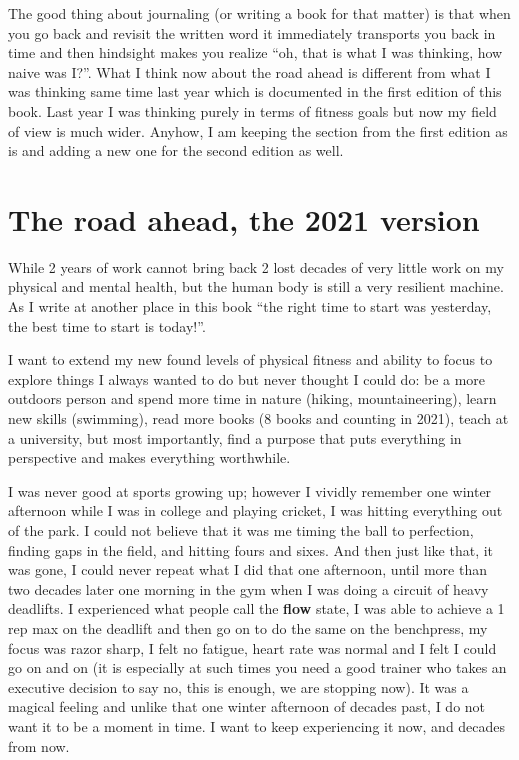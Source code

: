 \documentclass[
  oneside]{book}
\begin{document}
The good thing about journaling (or writing a book for that matter) is that when you go back and revisit the written word it immediately transports you back in time and then hindsight makes you realize ``oh, that is what I was thinking, how naive was I?''. What I think now about the road ahead is different from what I was thinking same time last year which is documented in the first edition of this book. Last year I was thinking purely in terms of fitness goals but now my field of view is much wider. Anyhow, I am keeping the section from the first edition as is and adding a new one for the second edition as well.

\hypertarget{the-road-ahead-the-2021-version}{%
\section{The road ahead, the 2021 version}\label{the-road-ahead-the-2021-version}}

While 2 years of work cannot bring back 2 lost decades of very little work on my physical and mental health, but the human body is still a very resilient machine. As I write at another place in this book ``the right time to start was yesterday, the best time to start is today!''.

I want to extend my new found levels of physical fitness and ability to focus to explore things I always wanted to do but never thought I could do: be a more outdoors person and spend more time in nature (hiking, mountaineering), learn new skills (swimming), read more books (8 books and counting in 2021), teach at a university, but most importantly, find a purpose that puts everything in perspective and makes everything worthwhile.

I was never good at sports growing up; however I vividly remember one winter afternoon while I was in college and playing cricket, I was hitting everything out of the park. I could not believe that it was me timing the ball to perfection, finding gaps in the field, and hitting fours and sixes. And then just like that, it was gone, I could never repeat what I did that one afternoon, until more than two decades later one morning in the gym when I was doing a circuit of heavy deadlifts. I experienced what people call the \textbf{flow} state, I was able to achieve a 1 rep max on the deadlift and then go on to do the same on the benchpress, my focus was razor sharp, I felt no fatigue, heart rate was normal and I felt I could go on and on (it is especially at such times you need a good trainer who takes an executive decision to say no, this is enough, we are stopping now). It was a magical feeling and unlike that one winter afternoon of decades past, I do not want it to be a moment in time. I want to keep experiencing it now, and decades from now.
\end{document}
